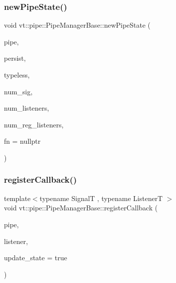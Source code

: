 \mbox{\label{structvt_1_1pipe_1_1_pipe_manager_base_a458f8135ed2a44ec51afb21676c5db50}} 
\subsubsection{\texorpdfstring{new\+Pipe\+State()}{newPipeState()}}
{\footnotesize\ttfamily void vt\+::pipe\+::\+Pipe\+Manager\+Base\+::new\+Pipe\+State (\begin{DoxyParamCaption}\item[{\hyperlink{namespacevt_ac9852acda74d1896f48f406cd72c7bd3}{Pipe\+Type} const \&}]{pipe,  }\item[{bool}]{persist,  }\item[{bool}]{typeless,  }\item[{\hyperlink{namespacevt_a9b39ce9494bb04674d0d5b895a5aa50f}{Ref\+Type}}]{num\+\_\+sig,  }\item[{\hyperlink{namespacevt_a9b39ce9494bb04674d0d5b895a5aa50f}{Ref\+Type}}]{num\+\_\+listeners,  }\item[{\hyperlink{namespacevt_a9b39ce9494bb04674d0d5b895a5aa50f}{Ref\+Type}}]{num\+\_\+reg\+\_\+listeners,  }\item[{\hyperlink{structvt_1_1pipe_1_1_pipe_manager_base_a983e301505317c5ba2041461e7dec84a}{Dispatch\+Func\+Type}}]{fn = {\ttfamily nullptr} }\end{DoxyParamCaption})\hspace{0.3cm}{\ttfamily [protected]}}

\mbox{\label{structvt_1_1pipe_1_1_pipe_manager_base_a27f1aea903f8e05655eb84ae1474c729}} 
\subsubsection{\texorpdfstring{register\+Callback()}{registerCallback()}}
{\footnotesize\ttfamily template$<$typename SignalT , typename ListenerT $>$ \\
void vt\+::pipe\+::\+Pipe\+Manager\+Base\+::register\+Callback (\begin{DoxyParamCaption}\item[{\hyperlink{namespacevt_ac9852acda74d1896f48f406cd72c7bd3}{Pipe\+Type} const \&}]{pipe,  }\item[{ListenerT \&\&}]{listener,  }\item[{bool}]{update\+\_\+state = {\ttfamily true} }\end{DoxyParamCaption})\hspace{0.3cm}{\ttfamily [protected]}}

